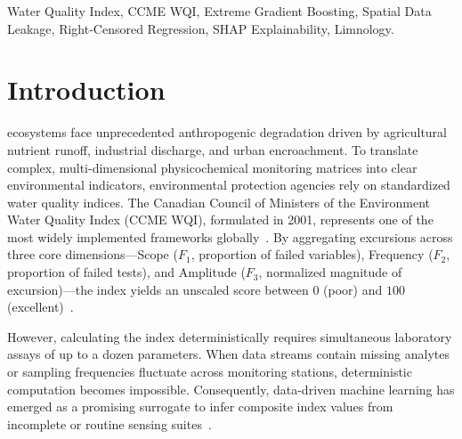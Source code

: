 \documentclass[journal,10pt,twocolumn]{IEEEtran}
\begin{document}
\begin{IEEEkeywords}
Water Quality Index, CCME WQI, Extreme Gradient Boosting, Spatial Data Leakage, Right-Censored Regression, SHAP Explainability, Limnology.
\end{IEEEkeywords}

\section{Introduction}
 ecosystems face unprecedented anthropogenic degradation driven by agricultural nutrient runoff, industrial discharge, and urban encroachment. To translate complex, multi-dimensional physicochemical monitoring matrices into clear environmental indicators, environmental protection agencies rely on standardized water quality indices. The Canadian Council of Ministers of the Environment Water Quality Index (CCME WQI), formulated in 2001, represents one of the most widely implemented frameworks globally~\cite{ccme2001, lumb2006application}. By aggregating excursions across three core dimensions---Scope ($F_1$, proportion of failed variables), Frequency ($F_2$, proportion of failed tests), and Amplitude ($F_3$, normalized magnitude of excursion)---the index yields an unscaled score between $0$ (poor) and $100$ (excellent)~\cite{ccme2001}.

However, calculating the index deterministically requires simultaneous laboratory assays of up to a dozen parameters. When data streams contain missing analytes or sampling frequencies fluctuate across monitoring stations, deterministic computation becomes impossible. Consequently, data-driven machine learning has emerged as a promising surrogate to infer composite index values from incomplete or routine sensing suites~\cite{ahmed2019efficient, tyagi2013water}.
\end{document}
